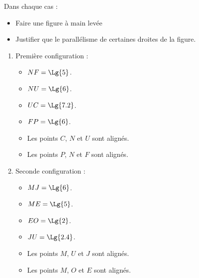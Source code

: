 \begin{exercice*}
    Dans chaque cas :
    \begin{itemize}
        \item Faire une figure à main levée
        \item Justifier que le parallélisme de certaines droites de la figure.
    \end{itemize}

    \begin{enumerate}
        \item Première configuration :
        \begin{itemize}
            \item $NF=\Lg{5}$.
            \item $NU=\Lg{6}$.
            \item $UC=\Lg{7.2}$.
            \item $FP=\Lg{6}$.
            \item Les points $C$, $N$ et $U$ sont alignés.
            \item Les points $P$, $N$ et $F$ sont alignés.
        \end{itemize}
        \item Seconde configuration :
        \begin{itemize}
            \item $MJ=\Lg{6}$.
            \item $ME=\Lg{5}$.
            \item $EO=\Lg{2}$.
            \item $JU=\Lg{2.4}$.
            \item Les points $M$, $U$ et $J$ sont alignés.
            \item Les points $M$, $O$ et $E$ sont alignés.
        \end{itemize}

    \end{enumerate}

\end{exercice*}
